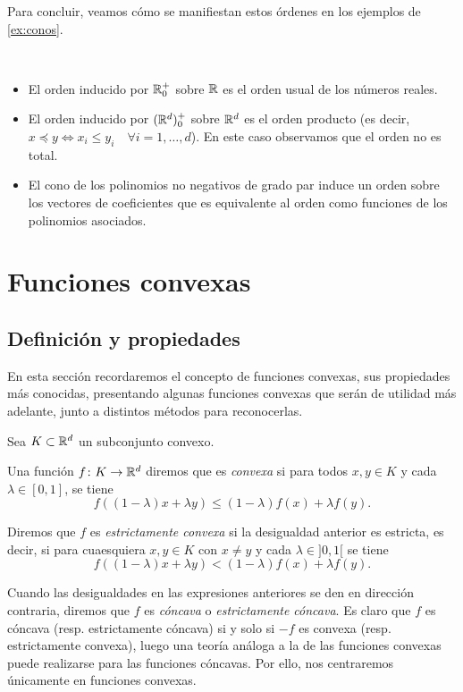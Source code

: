 \documentclass{book}
\begin{document}
Para concluir, veamos cómo se manifiestan estos órdenes en los ejemplos de \ref{ex:conos}.
\begin{example}~
	\begin{itemize}
		\item El orden inducido por $\mathbb{R}^+_0$ sobre $\mathbb{R}$ es el orden usual de los números reales.
		\item El orden inducido por $(\mathbb{R}^d)^+_0$ sobre $\mathbb{R}^d$ es el orden producto (es decir, $x \preceq y \iff x_i \le y_i \quad \forall i=1,\dots,d$). En este caso observamos que el orden no es total.
		\item El cono de los polinomios no negativos de grado par induce un orden sobre los vectores de coeficientes que es equivalente al orden como funciones de los polinomios asociados.
\end{itemize}
\end{example}

\section{Funciones convexas}

\subsection{Definición y propiedades}

En esta sección recordaremos el concepto de funciones convexas, sus propiedades más conocidas, presentando algunas funciones convexas que serán de utilidad más adelante, junto a distintos métodos para reconocerlas.

\begin{definition}
	Sea $K \subset \mathbb{R}^d$ un subconjunto convexo. 

	Una función $f \colon K \to \mathbb{R}^d$ diremos que es \emph{convexa} si para todos $x,y \in K$ y cada $\lambda \in [0,1]$, se tiene
	\[f((1-\lambda)x+\lambda y) \le (1-\lambda) f(x) + \lambda f(y). \]

	Diremos que $f$ es \emph{estrictamente convexa} si la desigualdad anterior es estricta, es decir, si para cuaesquiera $x,y \in K$ con $x\ne y$ y cada $\lambda \in ]0,1[$ se tiene
	\[f((1-\lambda)x+\lambda y) < (1-\lambda)f(x) + \lambda f(y). \]

	Cuando las desigualdades en las expresiones anteriores se den en dirección contraria, diremos que $f$ es \emph{cóncava} o \emph{estrictamente cóncava}. Es claro que $f$ es cóncava (resp. estrictamente cóncava) si y solo si $-f$ es convexa (resp. estrictamente convexa), luego una teoría análoga a la de las funciones convexas puede realizarse para las funciones cóncavas. Por ello, nos centraremos únicamente en funciones convexas.
\end{definition}
\end{document}

